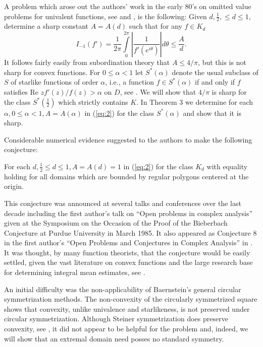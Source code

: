 A problem which arose out the authors' work in the early 80's on
omitted value problems for univalent functions, see \cite{2} and
\cite{4}, is the following:  Given $d, \frac{1}{2}, \leq d\leq 1$,
determine a sharp constant $A=A(d)$ such that for any $f\in K_d$
\begin{equation}
\label{eq:2}
I_{-1}(f') =\frac{1}{2\pi} \int\limits^{2\pi}_{0}
\left|\frac{1}{f'(e^{i\theta})}\right| d\theta \leq \frac{A}{d}.
\end{equation}
It follows fairly easily from subordination theory that $A\leq
4/\pi$, but this is not sharp for convex functions.  For $0\leq
\alpha < 1$ let $S^\ast(\alpha)$ denote the usual subclass of $S$ of
starlike functions of order $\alpha$, i.e., a function $f\in S^\ast
(\alpha)$ if and only if $f$ satisfies Re $zf'(z)/f(z)>\alpha$ on
$D$, see \cite{9}.  We will show that $4/\pi$ is sharp for the class
$S^\ast (\frac{1}{2})$ which strictly contains $K$.  In Theorem 3 we
determine for each $\alpha, 0\leq \alpha <1, A=A(\alpha)$ in
(\ref{eq:2}) for the class $S^\ast (\alpha)$ and show that it is
sharp.

Considerable numerical evidence suggested to the authors to make the
following conjecture:

\begin{conjecture}
For each $d, \frac{1}{2} \leq d\leq 1,
A=A(d)=1$ in {\rm (\ref{eq:2})} for the class $K_d$ with equality holding
for all domains which are bounded by regular polygons centered at the
origin.
\end{conjecture}

This conjecture was announced at several talks and conferences over
the last decade including the first author's talk on ``Open problems
in complex analysis'' given at the Symposium on the Occasion of the
Proof of the Bieberbach Conjecture at Purdue University in March
1985.  It also appeared as Conjecture 8 in the first author's ``Open
Problems and Conjectures in Complex Analysis'' in \cite{2}.  It was
thought, by many function theorists, that the conjecture would be
easily settled, given the vast literature on convex functions and the
large research base for determining integral mean estimates, see
\cite{6}.

An initial difficulty was the non-applicability of Baernstein's
general circular symmetrization methods.  The non-convexity of the
circularly symmetrized square shows that convexity, unlike univalence
and starlikeness, is not preserved under circular symmetrization.
Although Steiner symmetrization does preserve convexity, see \cite{10},
it did not appear to be helpful for the problem and, indeed, we will
show that an extremal domain need posses no standard symmetry.

